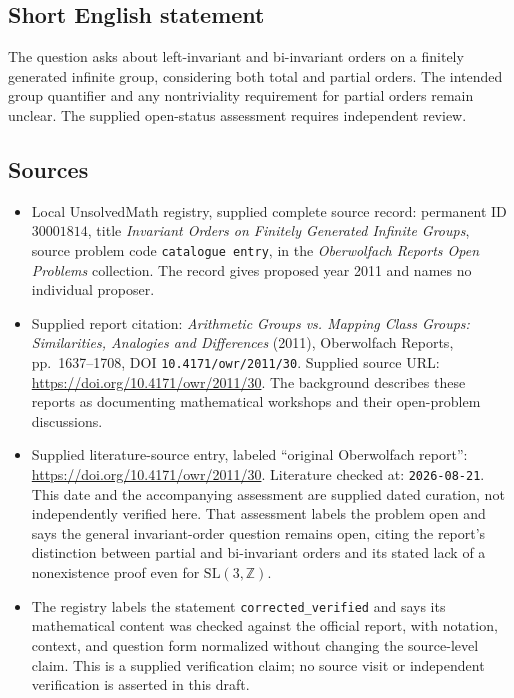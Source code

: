 \documentclass[11pt]{article}
\newcommand{\Z}{\mathbb{Z}}
\begin{document}
\subsection{Short English statement}
The question asks about left-invariant and bi-invariant orders on a finitely generated infinite group, considering both total and partial orders. The intended group quantifier and any nontriviality requirement for partial orders remain unclear. The supplied open-status assessment requires independent review.
\subsection{Sources}
\begin{itemize}
\item Local UnsolvedMath registry, supplied complete source record: permanent ID \(30001814\), title \emph{Invariant Orders on Finitely Generated Infinite Groups}, source problem code \texttt{catalogue entry}, in the \emph{Oberwolfach Reports Open Problems} collection. The record gives proposed year 2011 and names no individual proposer.
\item Supplied report citation: \emph{Arithmetic Groups vs. Mapping Class Groups: Similarities, Analogies and Differences} (2011), Oberwolfach Reports, pp.~1637--1708, DOI \texttt{10.4171/owr/2011/30}. Supplied source URL: \url{https://doi.org/10.4171/owr/2011/30}. The background describes these reports as documenting mathematical workshops and their open-problem discussions.
\item Supplied literature-source entry, labeled ``original Oberwolfach report'': \url{https://doi.org/10.4171/owr/2011/30}. Literature checked at: \texttt{2026-08-21}. This date and the accompanying assessment are supplied dated curation, not independently verified here. That assessment labels the problem open and says the general invariant-order question remains open, citing the report's distinction between partial and bi-invariant orders and its stated lack of a nonexistence proof even for \(\mathrm{SL}(3,\Z)\).
\item The registry labels the statement \texttt{corrected\_verified} and says its mathematical content was checked against the official report, with notation, context, and question form normalized without changing the source-level claim. This is a supplied verification claim; no source visit or independent verification is asserted in this draft.
\end{itemize}
\end{document}
